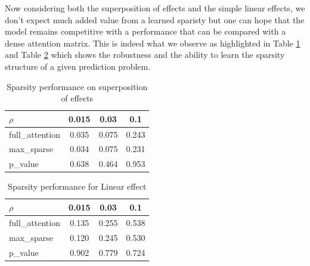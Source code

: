 \documentclass{article}
\begin{document}
Now considering both the superposition of effects and the simple linear effects, we don't expect much added value from a learned sparisty but one can hope that the model remains competitive with a performance that can be compared with a dense attention matrix. This is indeed what we observe as highlighted in Table \ref{tab:all_sparse} and Table \ref{tab:lin_sparse} which shows the robustness and the ability to learn the sparsity structure of a given prediction problem.


\begin{table}[t]
    \centering
\begin{tabular}{lccc}
\toprule
$\rho$ & 0.015 & 0.03 & 0.1 \\
\midrule
full\_attention & {\cellcolor[HTML]{B40426}} \color[HTML]{F1F1F1} 0.035 & {\cellcolor[HTML]{3B4CC0}} \color[HTML]{F1F1F1} 0.075 & {\cellcolor[HTML]{B40426}} \color[HTML]{F1F1F1} 0.243 \\
max\_sparse & {\cellcolor[HTML]{3B4CC0}} \color[HTML]{F1F1F1} 0.034 & {\cellcolor[HTML]{B40426}} \color[HTML]{F1F1F1} 0.075 & {\cellcolor[HTML]{3B4CC0}} \color[HTML]{F1F1F1} 0.231 \\
p\_value & 0.638 & 0.464 & 0.953 \\
\bottomrule
\end{tabular}
\vskip 0.05in
\caption{Sparsity performance on superposition of effects}
\label{tab:all_sparse}
\end{table}

\begin{table}[t]
    \centering
\begin{tabular}{lccc}
\toprule
$\rho$ & 0.015 & 0.03 & 0.1 \\
\midrule
full\_attention & {\cellcolor[HTML]{B40426}} \color[HTML]{F1F1F1} 0.135 & {\cellcolor[HTML]{B40426}} \color[HTML]{F1F1F1} 0.255 & {\cellcolor[HTML]{B40426}} \color[HTML]{F1F1F1} 0.538 \\
max\_sparse & {\cellcolor[HTML]{3B4CC0}} \color[HTML]{F1F1F1} 0.120 & {\cellcolor[HTML]{3B4CC0}} \color[HTML]{F1F1F1} 0.245 & {\cellcolor[HTML]{3B4CC0}} \color[HTML]{F1F1F1} 0.530 \\
p\_value & 0.902 & 0.779 & 0.724 \\
\bottomrule
\end{tabular}
\vskip 0.05in
\caption{Sparsity performance for Linear effect}
    \label{tab:lin_sparse}
\end{table}
\end{document}
